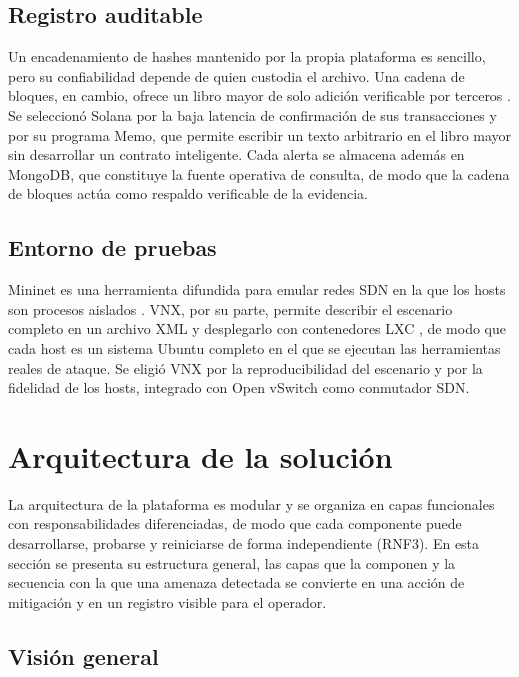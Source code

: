 \subsection{Registro auditable}

Un encadenamiento de hashes mantenido por la propia plataforma es sencillo, pero su confiabilidad depende de quien custodia el archivo. Una cadena de bloques, en cambio, ofrece un libro mayor de solo adición verificable por terceros \parencite{nakamoto2008}. Se seleccionó Solana por la baja latencia de confirmación de sus transacciones \parencite{solanawp} y por su programa Memo, que permite escribir un texto arbitrario en el libro mayor sin desarrollar un contrato inteligente. Cada alerta se almacena además en MongoDB, que constituye la fuente operativa de consulta, de modo que la cadena de bloques actúa como respaldo verificable de la evidencia.

\subsection{Entorno de pruebas}

Mininet es una herramienta difundida para emular redes SDN en la que los hosts son procesos aislados \parencite{lantz2010}. VNX, por su parte, permite describir el escenario completo en un archivo XML y desplegarlo con contenedores LXC \parencite{vnxdocs}, de modo que cada host es un sistema Ubuntu completo en el que se ejecutan las herramientas reales de ataque. Se eligió VNX por la reproducibilidad del escenario y por la fidelidad de los hosts, integrado con Open vSwitch como conmutador SDN.

\section{Arquitectura de la solución}
\label{sec:arquitectura}

La arquitectura de la plataforma es modular y se organiza en capas funcionales con responsabilidades diferenciadas, de modo que cada componente puede desarrollarse, probarse y reiniciarse de forma independiente (RNF3). En esta sección se presenta su estructura general, las capas que la componen y la secuencia con la que una amenaza detectada se convierte en una acción de mitigación y en un registro visible para el operador.

\subsection{Visión general}

